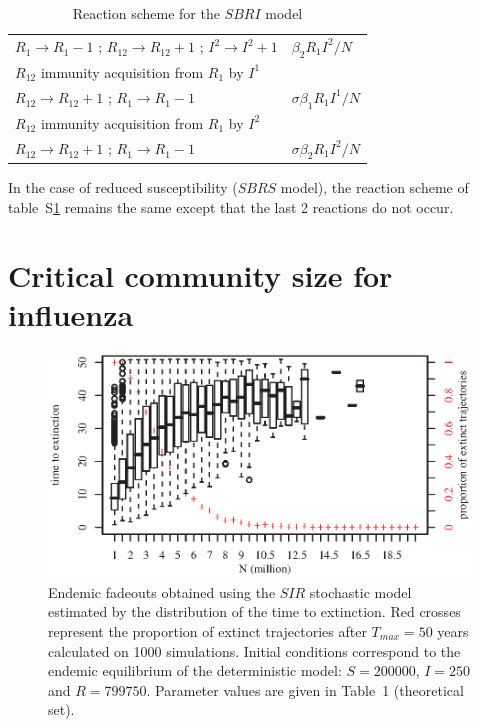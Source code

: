 \begin{table}[!h]
\begin{tabular}{ll}
		$R_1 \rightarrow R_1-1$ ; $R_{12} \rightarrow R_{12}+1$ ; $I^2 \rightarrow I^2+1$ &  $\beta_2 R_1 I^2/N$ \\
		$R_{12}$ immunity acquisition from $R_1$ by $I^1$ \\
		$R_{12} \rightarrow R_{12}+1$ ; $R_1 \rightarrow R_1-1$ &  $\sigma \beta_1 R_1 I^1/N$ \\
		$R_{12}$ immunity acquisition from $R_1$ by $I^2$ \\
		$R_{12} \rightarrow R_{12}+1$ ; $R_1 \rightarrow R_1-1$ & $\sigma \beta_2 R_1 I^2/N$
	\end{tabular}
	\caption{Reaction scheme for the $SBRI$ model}
	\label{tab:reaction}
\end{table}

In the case of reduced susceptibility ($SBRS$ model), the reaction scheme of table~S\ref{tab:reaction} remains the same except that the last 2 reactions do not occur.


\clearpage

\section{Critical community size for influenza}

\begin{figure}[!h]
  \center
  \includegraphics[]{graphs/article1/css_sir.eps}
  \caption{Endemic fadeouts obtained using the $SIR$ stochastic model
    estimated by the distribution of the time to extinction. Red
    crosses represent the proportion of extinct trajectories after
    $T_{max} = 50$ years calculated on 1000 simulations. Initial
    conditions correspond to the endemic equilibrium of the
    deterministic model: $S=200000$, $I=250$ and $R=799750$. Parameter
    values are given in Table~1 (theoretical set).}
\label{fig:ccs}
\end{figure}



